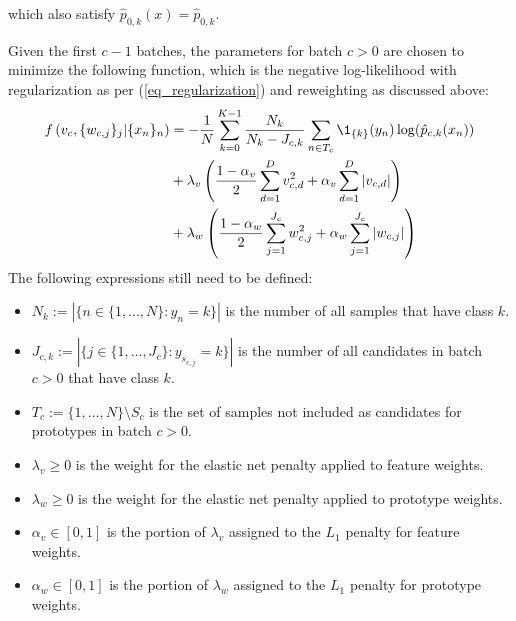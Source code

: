 %
which also satisfy $\hat{p}_{0,k}(x)=\hat{p}_{0,k}$.
%
\begin{center}\end{center}
%
\begin{center}\end{center}
%
Given the first $c-1$ batches, the parameters for batch $c>0$ are chosen to minimize the following function, which is the negative log-likelihood with regularization as per (\ref{eq_regularization}) and reweighting as discussed above:
%
\begin{align}
f\left(v_c,\{w_{c,j}\}_j|\{x_n\}_n\right)
&=-\frac{1}{N}\sum_{k=0}^{K-1}\frac{N_k}{N_k-J_{c,k}}\sum_{n\in T_c}
\1_{\{k\}}(y_n)\log(\hat{p}_{c,k}(x_n))\label{eq_log_likelihood}\\
&+\lambda_v\left(\frac{1-\alpha_v}{2}\sum_{d=1}^Dv_{c,d}^2
+\alpha_v\sum_{d=1}^D|v_{c,d}|\right)\notag\\
&+\lambda_w\left(\frac{1-\alpha_w}{2}\sum_{j=1}^{J_c}w_{c,j}^2
+\alpha_w\sum_{j=1}^{J_c}|w_{c,j}|\right)\notag
\end{align}
%
The following expressions still need to be defined:
%
\begin{itemize}
\item $N_k:=\left|\{n\in\{1,\dots,N\}:y_n=k\}\right|$ is the number of all samples that have class $k$.
%
\item $J_{c,k}:=\left|\{j\in\{1,\dots,J_c\}:y_{s_{c,j}}=k\}\right|$
is the number of all candidates in batch $c>0$ that have class $k$.
%
\item $T_c:=\{1,\dots,N\}\setminus S_c$ is the set of samples not included as candidates for prototypes in batch $c>0$.
%
\item $\lambda_v\geq0$ is the weight for the elastic net penalty applied to feature weights.
%
\item $\lambda_w\geq0$ is the weight for the elastic net penalty applied to prototype weights.
%
\item $\alpha_v\in[0,1]$ is the portion of $\lambda_v$ assigned to the $L_1$ penalty for feature weights.
%
\item $\alpha_w\in[0,1]$ is the portion of $\lambda_w$ assigned to the $L_1$ penalty for prototype weights.
\end{itemize}
